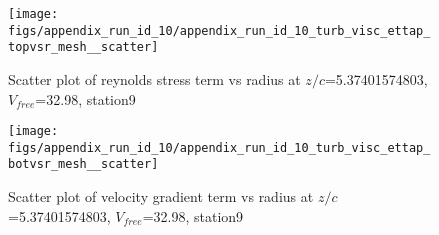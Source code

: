 \begin{figure}[H]
\centering
\texttt{[image: figs/appendix\_run\_id\_10/appendix\_run\_id\_10\_turb\_visc\_ettap\_topvsr\_mesh\_\_scatter]}
\caption{Scatter plot of reynolds stress term vs radius at $z/c$=5.37401574803, $V_{free}$=32.98, station9}
\label{fig:appendix_run_id_10_turb_visc_ettap_topvsr_mesh__scatter}
\end{figure}


\begin{figure}[H]
\centering
\texttt{[image: figs/appendix\_run\_id\_10/appendix\_run\_id\_10\_turb\_visc\_ettap\_botvsr\_mesh\_\_scatter]}
\caption{Scatter plot of velocity gradient term vs radius at $z/c$=5.37401574803, $V_{free}$=32.98, station9}
\label{fig:appendix_run_id_10_turb_visc_ettap_botvsr_mesh__scatter}
\end{figure}


